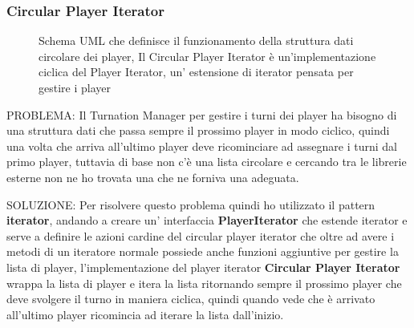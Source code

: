 \subsubsection{Circular Player Iterator}
\begin{figure}[H]
    \centering
    \caption{Schema UML che definisce il funzionamento della struttura dati circolare dei player, Il Circular Player Iterator è un'implementazione ciclica del Player Iterator,
    un' estensione di iterator pensata per gestire i player}
	\label{img:Iterator}
\end{figure}

PROBLEMA:
Il Turnation Manager per gestire i turni dei player ha bisogno di una struttura dati che passa sempre il prossimo player in modo ciclico, 
quindi una volta che arriva all'ultimo player deve ricominciare ad assegnare i turni dal primo player, tuttavia di base non c'è una lista circolare 
e cercando tra le librerie esterne non ne ho trovata una che ne forniva una adeguata.\newline

SOLUZIONE:
Per risolvere questo problema quindi ho utilizzato il pattern \textbf{iterator}, andando a creare un' interfaccia \textbf{PlayerIterator} che estende iterator 
e serve a definire le azioni cardine del circular player iterator che oltre ad avere i metodi di un iteratore normale possiede anche funzioni aggiuntive per gestire la lista di player,
l'implementazione del player iterator \textbf{Circular Player Iterator} wrappa la lista di player e itera la lista ritornando sempre il prossimo player 
che deve svolgere il turno in maniera ciclica, quindi quando vede che è arrivato all'ultimo player ricomincia ad iterare la lista dall'inizio.\newline

